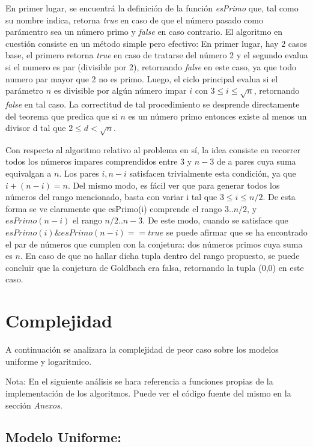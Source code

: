 \documentclass[a4paper,10pt] {article}
\begin{document}
En primer lugar, se encuentr\'a la definici\'on de la funci\'on \textit{esPrimo}
que, tal como su nombre indica, retorna \textit{true} en caso de que el n\'umero
pasado como par\'amentro sea un n\'umero primo y \textit{false} en caso
contrario. El algoritmo en cuesti\'on consiste en un m\'etodo simple pero
efectivo: En primer lugar, hay 2 casos base, el primero retorna \textit{true} en caso de
tratarse del n\'umero 2 y el segundo evalua si el numero es par (divisible por
2), retornando \textit{false} en este caso, ya que todo numero par mayor que 2
no es primo. Luego, el ciclo principal evalua si el par\'ametro $n$ es divisible
por alg\'un n\'umero impar $i$ con $3 \leq i \leq \sqrt{n}$, retornando
\textit{false} en tal caso. La correctitud de tal procedimiento se desprende
directamente del teorema que predica que si $n$ es un n\'umero primo entonces
existe al menos un divisor d tal que $2 \leq d < \sqrt{n}$.

Con respecto al algoritmo relativo al problema en s\'i, la idea consiste en
recorrer todos los n\'umeros impares comprendidos entre $3$ y $n-3$ de a pares
cuya suma equivalgan a $n$. Los pares $i, n - i$ satisfacen trivialmente esta condici\'on, ya que $i + (n-i) = n$. Del mismo modo, es f\'acil ver que para generar todos los n\'umeros del rango mencionado, basta con variar i tal que $3 \le i \le n/2$. De esta forma se ve claramente que esPrimo(i) comprende el rango $3..n/2$, y $esPrimo(n-i)$ el rango $n/2..n-3$. De este modo, cuando se satisface que $esPrimo(i) \& esPrimo(n-i) == true$ se puede afirmar que se ha encontrado el par de n\'umeros que cumplen con la conjetura: dos n\'umeros primos cuya suma es $n$. En caso de que no hallar dicha tupla dentro del rango propuesto, se puede concluir que la conjetura de Goldbach era falsa, retornando la tupla (0,0) en este caso.  

\section*{Complejidad}

A continuaci\'on se analizara la complejidad de peor caso sobre los modelos
uniforme y logaritmico. 

Nota: En el siguiente an\'alisis se hara referencia a funciones propias de la implementaci\'on de los algoritmos. Puede ver el c\'odigo fuente del mismo en la secci\'on \textit{Anexos}.

\subsection*{Modelo Uniforme:}
\end{document}
